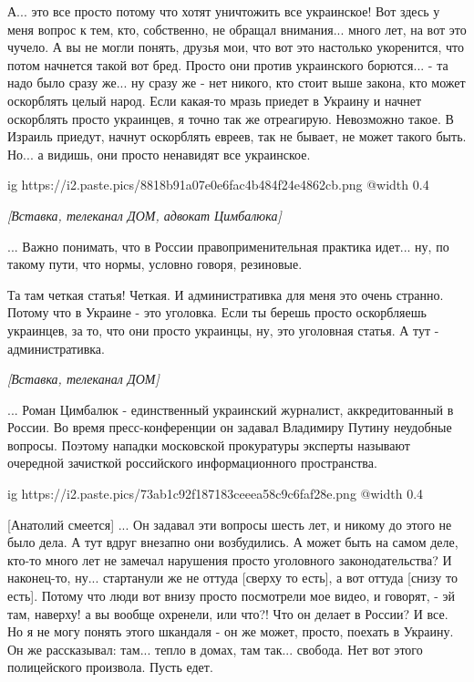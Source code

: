 \begin{multicols}{2}
А... это все просто потому что хотят уничтожить все украинское! Вот здесь у меня 
вопрос к тем, кто, собственно, не обращал внимания... много лет, на вот это 
чучело. А вы не могли понять, друзья мои, что вот это настолько укоренится, что потом начнется такой вот
бред. Просто они против украинского борются... - та надо было сразу же... ну сразу же - нет 
никого, кто стоит выше закона, кто может оскорблять целый народ. Если какая-то мразь
приедет в Украину и начнет оскорблять просто украинцев, я точно так же отреагирую. 
Невозможно такое. В Израиль приедут, начнут оскорблять евреев, так не бывает, не может такого быть.
Но... а видишь, они просто ненавидят все украинское. 

\ifcmt
  ig https://i2.paste.pics/8818b91a07e0e6fac4b484f24e4862cb.png
  @width 0.4
\fi

{\em\color{blue}
[Вставка, телеканал ДОМ, адвокат Цимбалюка]

... Важно понимать, что в России правоприменительная практика идет... ну, по
такому пути, что нормы, условно говоря, резиновые.
}

Та там четкая статья! Четкая. И административка для меня это очень странно. Потому что в Украине - 
это уголовка. Если ты берешь просто оскорбляешь украинцев, за то, что они просто украинцы, ну, это
уголовная статья. А тут - административка. 

{\em\color{blue}
[Вставка, телеканал ДОМ]

... Роман Цимбалюк - единственный украинский журналист, аккредитованный в России. Во время
пресс-конференции он задавал Владимиру Путину неудобные вопросы. Поэтому нападки московской 
прокуратуры эксперты называют очередной зачисткой российского информационного пространства.
}

\ifcmt
  ig https://i2.paste.pics/73ab1c92f187183ceeea58c9c6faf28e.png
  @width 0.4
\fi

[Анатолий смеется] ... Он задавал эти вопросы шесть лет, и никому до этого не
было дела. А тут вдруг внезапно они возбудились. А может быть на самом деле,
кто-то много лет не замечал нарушения просто уголовного законодательства? И
наконец-то, ну...  стартанули же не оттуда [сверху то есть], а вот оттуда
[снизу то есть]. Потому что люди вот внизу просто посмотрели мое видео, и
говорят, - эй там, наверху! а вы вообще охренели, или что?! Что он делает в
России? И все. Но я не могу понять этого шкандаля - он же может, просто,
поехать в Украину.  Он же рассказывал: там... тепло в домах, там так...
свобода. Нет вот этого полицейского произвола. Пусть едет.


\end{multicols}
